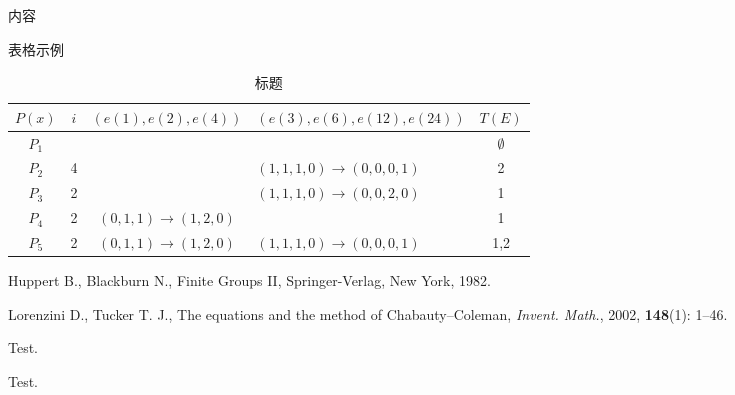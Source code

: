 \documentclass{amsc}          %
\numberwithin{equation}{section} %
\begin{document}

\begin{theorem}
内容
\end{theorem}


表格示例\begin{table}[h]
 \centering\begin{tabular}{|c|c|c|l|c|}
\hline $P(x)$ & $i$& $(e(1),e(2),e(4))$ & $(e(3),e(6),e(12),e(24))$ & $T(E)$ \\
\hline $P_1$  &    & & &$\emptyset$ \\
\hline $P_2$  & 4  & & $(1,1,1,0)\rightarrow(0,0,0,1)$ &2\\
\hline $P_3$  & 2  & &$(1,1,1,0)\rightarrow(0,0,2,0)$ &1\\
\hline $P_4$  & 2  & $(0,1,1)\rightarrow(1,2,0)$ & &1\\
\hline $P_5$  & 2  & $(0,1,1)\rightarrow(1,2,0)$ &$(1,1,1,0)\rightarrow(0,0,0,1)$ &1,2\\
\hline
\end{tabular}
\caption{标题\label{tab}}
\end{table}



\BeginRef
{} Huppert B., Blackburn N., Finite Groups II,
Springer-Verlag,  New York, 1982.

 Lorenzini D., Tucker T. J., The equations and the
method of Chabauty--Coleman, {\it Invent. Math.}, 2002, {\bf
148}(1): 1--46.

 Test.

 Test.

\EndRef
\end{document}
